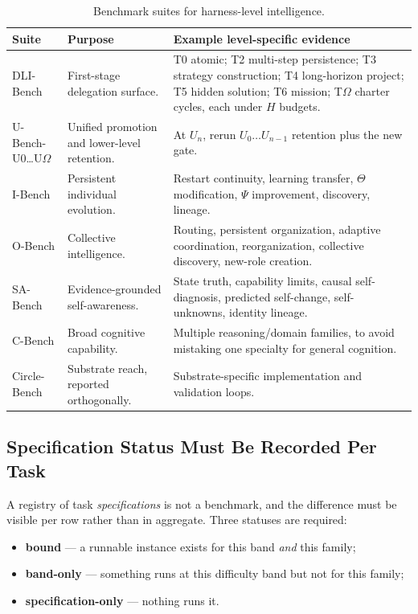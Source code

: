 \documentclass[11pt]{article}
\theoremstyle{definition}
\newcommand{\Om}{\ensuremath{\Omega}}
\begin{document}
\begin{table}[!htbp]
\centering\small
\begin{tabularx}{\textwidth}{@{}lYY@{}}
\toprule
Suite & Purpose & Example level-specific evidence \\
\midrule
DLI-Bench & First-stage delegation surface. & T0 atomic; T2 multi-step persistence; T3 strategy construction; T4 long-horizon project; T5 hidden solution; T6 mission; T\Om{} charter cycles, each under $H$ budgets. \\
U-Bench-U0\ldots U\Om{} & Unified promotion and lower-level retention. & At $U_n$, rerun $U_0 \ldots U_{n-1}$ retention plus the new gate. \\
I-Bench & Persistent individual evolution. & Restart continuity, learning transfer, $\Theta$ modification, $\Psi$ improvement, discovery, lineage. \\
O-Bench & Collective intelligence. & Routing, persistent organization, adaptive coordination, reorganization, collective discovery, new-role creation. \\
SA-Bench & Evidence-grounded self-awareness. & State truth, capability limits, causal self-diagnosis, predicted self-change, self-unknowns, identity lineage. \\
C-Bench & Broad cognitive capability. & Multiple reasoning/domain families, to avoid mistaking one specialty for general cognition. \\
Circle-Bench & Substrate reach, reported orthogonally. & Substrate-specific implementation and validation loops. \\
\bottomrule
\end{tabularx}
\caption{Benchmark suites for harness-level intelligence.}
\label{tab:suites}
\end{table}

\subsection{Specification Status Must Be Recorded Per Task}

A registry of task \emph{specifications} is not a benchmark, and the difference must be visible per row rather than in aggregate. Three statuses are required:

\begin{itemize}
\item \textbf{bound} --- a runnable instance exists for this band \emph{and} this family;
\item \textbf{band-only} --- something runs at this difficulty band but not for this family;
\item \textbf{specification-only} --- nothing runs it.
\end{itemize}
\end{document}
